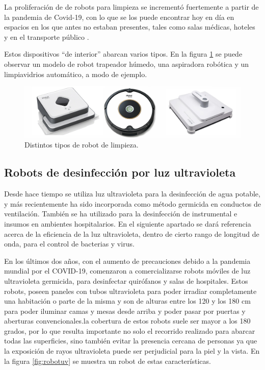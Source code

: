 La proliferación de de robots para limpieza se incrementó fuertemente a partir de la pandemia de Covid-19, con lo que se los puede encontrar hoy en día en espacios en los que antes no estaban presentes, tales como salas médicas,  hoteles y en el transporte público \citep{Cleaning}. 

Estos dispositivos “de interior” abarcan varios tipos. En la  figura \ref{fig:robotslimpieza} se puede observar un modelo de robot trapeador húmedo, una aspiradora robótica y un limpiavidrios automático, a modo de ejemplo.

\begin{figure}[h]
	\centering
	\includegraphics[width=\textwidth]{./Figures/robotslimpieza.jpg}
	\caption{Distintos tipos de robot de limpieza.}
	\label{fig:robotslimpieza}
\end{figure}



\subsection{Robots de desinfección por luz ultravioleta}

Desde hace tiempo se utiliza luz ultravioleta para la desinfección de agua potable, y más recientemente ha sido incorporada como método germicida en conductos de ventilación. También se ha utilizado para la desinfección de instrumental e insumos en ambientes hospitalarios. En el  siguiente apartado se dará referencia acerca de la eficiencia de la luz ultravioleta, dentro de cierto rango de longitud de onda, para el control de bacterias y virus.

En los últimos dos años, con el aumento de precauciones debido a la pandemia mundial por el COVID-19, comenzaron a comercializarse robots móviles de luz ultravioleta germicida, para desinfectar quirófanos y salas de hospitales. Estos robots, poseen paneles con tubos ultravioleta para poder irradiar completamente una habitación o parte de la misma y son de alturas entre los 120 y los 180 cm para poder iluminar camas y mesas desde arriba y poder pasar por puertas y aberturas convencionales.la cobertura de estos robots suele ser mayor a los 180 grados, por lo que resulta importante no solo el recorrido realizado para abarcar todas las superficies, sino también evitar la presencia cercana de personas ya que la exposición de rayos ultravioleta puede ser perjudicial para la piel y la vista. En la figura \ref{fig:robotuv} se muestra un robot de estas características. 


